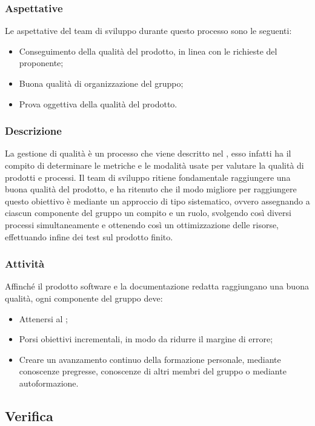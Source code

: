 \subsubsection{Aspettative}
Le aspettative del team di sviluppo durante questo processo sono le seguenti:
\begin {itemize}
\item Conseguimento della qualità del prodotto, in linea con le richieste del proponente;
\item Buona qualità di organizzazione del gruppo;
\item Prova oggettiva della qualità del prodotto.
\end {itemize}
\subsubsection{Descrizione}
La gestione di qualità è un processo che viene descritto nel \docNamePdQLow{}, esso infatti ha il compito di determinare le metriche e le modalità usate per valutare la qualità di prodotti e processi.
Il team di sviluppo ritiene fondamentale raggiungere una buona qualità del prodotto, e ha ritenuto che il modo migliore per raggiungere questo obiettivo è mediante un approccio di tipo sistematico, ovvero assegnando a ciascun componente del gruppo un compito e un ruolo, svolgendo così diversi processi simultaneamente e ottenendo così un ottimizzazione delle risorse, effettuando infine dei test sul prodotto finito.
\subsubsection{Attività}
Affinché il prodotto software e la documentazione redatta raggiungano una buona qualità, ogni componente del gruppo \groupName{} deve:
\begin{itemize}
\item Attenersi al \docNamePdQLow{};
\item Porsi obiettivi incrementali, in modo da ridurre il margine di errore;
\item Creare un avanzamento continuo della formazione personale, mediante conoscenze pregresse, conoscenze di altri membri del gruppo o mediante autoformazione.
\end {itemize}


\vspace{2cm}

\subsection{Verifica} \label{subsection: Verifica}
